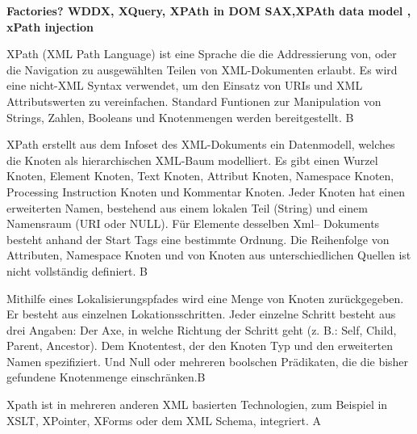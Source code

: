 
\textbf{Factories? WDDX, XQuery, XPAth in DOM SAX,XPAth data model , xPath injection}

XPath (XML Path Language) ist eine Sprache die die Addressierung von, oder die Navigation zu ausgewählten Teilen von XML-Dokumenten erlaubt. Es wird eine nicht-XML Syntax verwendet, um den Einsatz von URIs und XML Attributswerten zu vereinfachen. Standard Funtionen zur Manipulation von Strings, Zahlen, Booleans und Knotenmengen werden bereitgestellt. B

XPath erstellt aus dem Infoset des XML-Dokuments ein Datenmodell, welches die Knoten als hierarchischen XML-Baum modelliert. Es gibt einen Wurzel Knoten, Element Knoten, Text Knoten, Attribut Knoten, Namespace Knoten, Processing Instruction Knoten und Kommentar Knoten. Jeder Knoten hat einen erweiterten Namen, bestehend aus einem lokalen Teil (String) und einem Namensraum (URI oder NULL). Für Elemente desselben Xml-- Dokuments besteht anhand der Start Tags eine bestimmte Ordnung. Die Reihenfolge von Attributen, Namespace Knoten und von Knoten aus unterschiedlichen Quellen ist nicht vollständig definiert. B

Mithilfe eines Lokalisierungspfades wird eine Menge von Knoten zurückgegeben. Er besteht aus einzelnen Lokationsschritten. Jeder einzelne Schritt besteht aus drei Angaben: Der Axe, in welche Richtung der Schritt geht (z. B.: Self, Child, Parent, Ancestor). Dem Knotentest, der den Knoten Typ und den erweiterten Namen spezifiziert. Und Null oder mehreren boolschen Prädikaten, die die bisher gefundene Knotenmenge einschränken.B

Xpath ist in mehreren anderen XML basierten Technologien, zum Beispiel in XSLT, XPointer, XForms oder dem XML Schema, integriert. A






